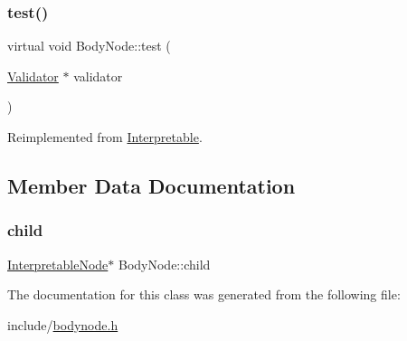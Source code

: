 \subsubsection{\texorpdfstring{test()}{test()}}
{\footnotesize\ttfamily virtual void Body\+Node\+::test (\begin{DoxyParamCaption}\item[{\hyperlink{classValidator}{Validator} $\ast$}]{validator }\end{DoxyParamCaption})\hspace{0.3cm}{\ttfamily [virtual]}}



Reimplemented from \hyperlink{classInterpretable_a32f547aaf68dcbab993284d3257ab010}{Interpretable}.



\subsection{Member Data Documentation}
\mbox{\label{classBodyNode_a6b18b29807903661a9f06e865331fca4}} 
\subsubsection{\texorpdfstring{child}{child}}
{\footnotesize\ttfamily \hyperlink{classInterpretableNode}{Interpretable\+Node}$\ast$ Body\+Node\+::child}



The documentation for this class was generated from the following file\+:\begin{DoxyCompactItemize}
\item 
include/\hyperlink{bodynode_8h}{bodynode.\+h}\end{DoxyCompactItemize}
